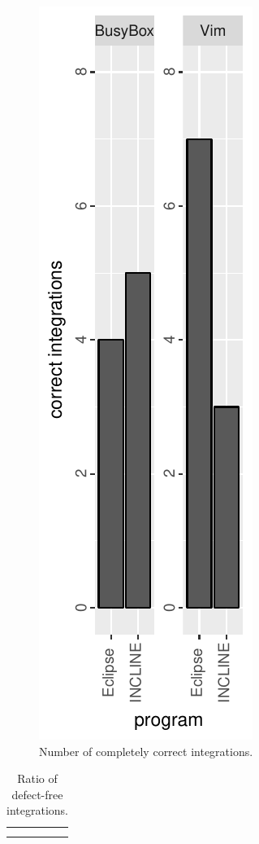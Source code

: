 \begin{figure}
    \centering
    \includegraphics[angle=-90,origin=c]{figure/incl-correct-ans.pdf}
    \caption{Number of completely correct integrations.}
    \label{fig:correct-ans}
\end{figure}

\begin{table}[ht]
    \centering
    \caption{Ratio of defect-free integrations.}
    \begin{tabular}{c|c}
         &  \\
         & 
    \end{tabular}    
    \label{tab:Bugs}
\end{table}

